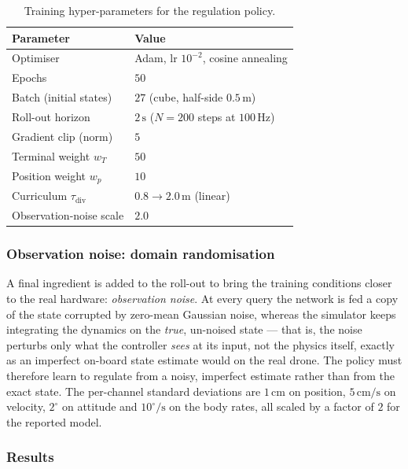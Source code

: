\documentclass[11pt,a4paper]{article}
\theoremstyle{remark}
\numberwithin{equation}{section}
\begin{document}
\begin{table}[h]
    \centering
    \caption{Training hyper-parameters for the regulation policy.}
    \label{tab:nn_hyperparams}
    \small
    \begin{tabular}{ll}
        \toprule
        Parameter & Value \\
        \midrule
        Optimiser            & Adam, lr $10^{-2}$, cosine annealing \\
        Epochs               & $50$ \\
        Batch (initial states) & $27$ (cube, half-side $0.5\,\mathrm{m}$) \\
        Roll-out horizon     & $2\,\mathrm{s}$ ($N=200$ steps at $100\,\mathrm{Hz}$) \\
        Gradient clip (norm) & $5$ \\
        Terminal weight $w_T$ & $50$ \\
        Position weight $w_p$ & $10$ \\
        Curriculum $\tau_{\mathrm{div}}$ & $0.8 \to 2.0\,\mathrm{m}$ (linear) \\
        Observation-noise scale & $2.0$ \\
        \bottomrule
    \end{tabular}
\end{table}

\subsubsection*{Observation noise: domain randomisation}

A final ingredient is added to the roll-out to bring the training conditions
closer to the real hardware: \emph{observation noise}. At every query the network
is fed a copy of the state corrupted by zero-mean Gaussian noise, whereas the
simulator keeps integrating the dynamics on the \emph{true}, un-noised state ---
that is, the noise perturbs only what the controller \emph{sees} at its input,
not the physics itself, exactly as an imperfect on-board state estimate would on
the real drone. The policy must therefore learn to regulate from a noisy,
imperfect estimate rather than from the exact state. The per-channel standard
deviations are $1\,\mathrm{cm}$ on position, $5\,\mathrm{cm/s}$ on velocity,
$2^\circ$ on attitude and $10^\circ/\mathrm{s}$ on the body rates, all scaled by
a factor of $2$ for the reported model.

\subsubsection*{Results}
\end{document}
